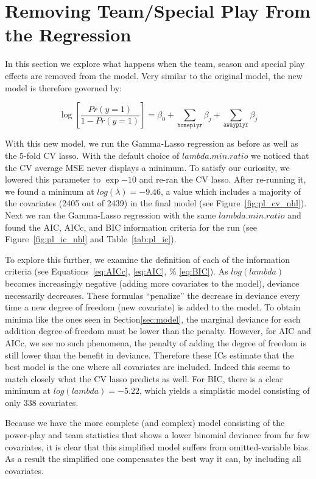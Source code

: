 \documentclass[11pt, fleqn]{article}
\begin{document}
\section{Removing Team/Special Play From the Regression}

In this section we explore what happens when the team, season and special play effects are removed from the model.  Very similar to the original model, the new model is therefore governed by:

\[ \log\left[\frac{Pr(y=1)}{1-Pr(y=1)}\right] = \beta_0 + \sum_{\texttt{homeplyr}} \beta_j + \sum_{\texttt{awayplyr}} \beta_j \]

With this new model, we run the Gamma-Lasso regression as before as well as the 5-fold CV lasso.  With the default choice of $lambda.min.ratio$ we noticed that the CV average MSE never displays a minimum.  To satisfy our curiosity, we lowered this parameter to $\exp{-10}$ and re-ran the CV lasso.  After re-running it, we found a minimum at $log(\lambda)=-9.46$, a value which includes a majority of the covariates (2405 out of 2439) in the final model (see Figure~\vref{fig:pl_cv_nhl}).  Next we ran the Gamma-Lasso regression with the same $lambda.min.ratio$ and found the AIC, AICc, and BIC information criteria for the run (see Figure~\vref{fig:pl_ic_nhl} and Table~\vref{tab:pl_ic}).

To explore this further, we examine the definition of each of the information criteria (see Equations~\eqref{eq:AICc}, \eqref{eq:AIC}, \% \eqref{eq:BIC}).  As $log(lambda)$ becomes increasingly negative (adding more covariates to the model), deviance necessarily decreases.  These formulas ``penalize'' the decrease in deviance every time a new degree of freedom (new covariate) is added to the model.  To obtain minima like the ones seen in Section\ref{sec:model}, the marginal deviance for each addition degree-of-freedom must be lower than the penalty.  However, for AIC and AICc, we see no such phenomena, the penalty of adding the degree of freedom is still lower than the benefit in deviance.  Therefore these ICs estimate that the best model is the one where all covariates are included.  Indeed this seems to match closely what the CV lasso predicts as well.  For BIC, there is a clear minimum at $log(lambda)=-5.22$, which yields a simplistic model consisting of only 338 covariates.



Because we have the more complete (and complex) model consisting of the power-play and team statistics that shows a lower binomial deviance from far few covariates, it is clear that this simplified model suffers from omitted-variable bias.  As a result the simplified one compensates the best way it can, by including all covariates. 
\end{document}
